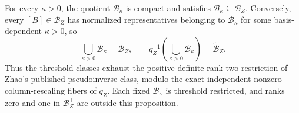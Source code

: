 For every \(\kappa>0\), the quotient \(\mathcal B_\kappa\) is compact and satisfies \(\mathcal B_\kappa\subseteq\mathcal B_Z\).  Conversely, every \([B]\in\mathcal B_Z\) has normalized representatives belonging to \(\mathcal B_\kappa\) for some basis-dependent \(\kappa>0\), so
\[
\bigcup_{\kappa>0}\mathcal B_\kappa=\mathcal B_Z,
\qquad
q_Z^{-1}\!\left(\bigcup_{\kappa>0}\mathcal B_\kappa\right)=\widetilde{\mathcal B}_Z.
\]
Thus the threshold classes exhaust the positive-definite rank-two restriction of Zhao's published pseudoinverse class, modulo the exact independent nonzero column-rescaling fibers of \(q_Z\).  Each fixed \(\mathcal B_\kappa\) is threshold restricted, and ranks zero and one in \(\mathcal B_Z^+\) are outside this proposition.